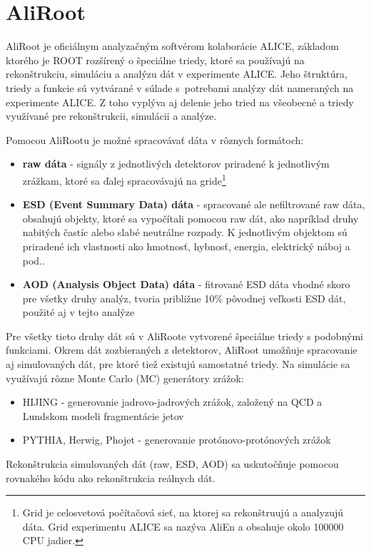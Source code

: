 \documentclass[thesismargins, thesislinespacing]{rnthesis}
\begin{document}
\section{AliRoot}
AliRoot je oficiálnym analyzačným softvérom kolaborácie ALICE, základom ktorého je ROOT rozšírený o špeciálne triedy, ktoré sa používajú na rekonštrukciu, simuláciu a analýzu dát v experimente ALICE. Jeho štruktúra, triedy a funkcie sú vytvárané v súlade s~potrebami analýzy dát nameraných na experimente ALICE. Z toho vyplýva aj delenie jeho tried na všeobecné a triedy využívané pre rekonštrukcii, simulácii a analýze. 

Pomocou AliRootu je možné spracovávať dáta v rôznych formátoch:
\begin{itemize}
	\item \textbf {raw dáta} - signály z jednotlivých detektorov priradené k jednotlivým zrážkam, ktoré sa ďalej spracovávajú na gride\footnote{Grid je celosvetová počítačová sieť, na ktorej sa rekonštruujú a analyzujú dáta. Grid experimentu ALICE sa nazýva AliEn a obsahuje okolo 100000 CPU jadier.} 
	\item \textbf {ESD (Event Summary Data) dáta} - spracované ale nefiltrované raw dáta, obsahujú objekty, ktoré sa vypočítali pomocou raw dát, ako napríklad druhy nabitých častíc alebo slabé neutrálne rozpady. K jednotlivým objektom sú priradené ich vlastnosti ako hmotnosť, hybnosť, energia, elektrický náboj a pod..
	\item \textbf {AOD (Analysis Object Data) dáta} - fitrované ESD dáta vhodné skoro pre všetky druhy analýz, tvoria približne 10\% pôvodnej veľkosti ESD dát, použité aj v tejto analýze
\end{itemize}

Pre všetky tieto druhy dát sú v AliRoote vytvorené špeciálne triedy s podobnými funkciami. Okrem dát zozbieraných z detektorov, AliRoot umožňuje spracovanie aj simulovaných dát, pre ktoré tiež existujú samostatné triedy. Na simulácie sa využívajú rôzne Monte Carlo (MC) generátory zrážok:
\begin{itemize}
	\item HIJING - generovanie jadrovo-jadrových zrážok, založený na QCD a Lundskom modeli fragmentácie jetov
	\item PYTHIA, Herwig, Phojet - generovanie protónovo-protónových zrážok
\end{itemize}

Rekonštrukcia simulovaných dát (raw, ESD, AOD) sa uskutočňuje pomocou rovnakého kódu ako rekonštrukcia reálnych dát.
\end{document}
